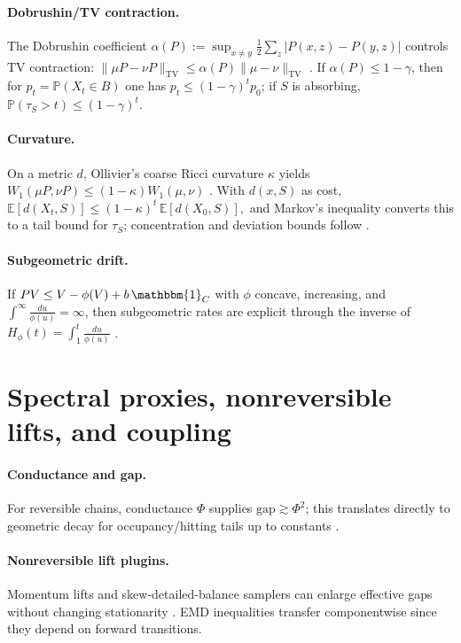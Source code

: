 \documentclass[11pt]{article}
\newcommand{\E}{\mathbb{E}}
\newcommand{\Prob}{\mathbb{P}}
\newcommand{\TV}{\mathrm{TV}}
\newcommand{\Wone}{W_1}
\newcommand{\1}{\mathbbm{1}}
\begin{document}
\paragraph{Dobrushin/TV contraction.}
The Dobrushin coefficient $\alpha(P):=\sup_{x\neq y}\tfrac12\sum_{z}|P(x,z)-P(y,z)|$ controls \(\TV\) contraction: $\|\mu P-\nu P\|_{\TV}\le \alpha(P)\|\mu-\nu\|_{\TV}$ \parencite[Ch.~4]{LevinPeresWilmer2009,Seneta2006}. If $\alpha(P)\le 1-\gamma$, then for $p_t=\Prob(X_t\in B)$ one has $p_t\le (1-\gamma)^t p_0$; if $S$ is absorbing, $\Prob(\tau_S>t)\le (1-\gamma)^t$.

\paragraph{Curvature.}
On a metric $d$, Ollivier’s coarse Ricci curvature $\kappa$ yields $\Wone(\mu P,\nu P)\le (1-\kappa)\Wone(\mu,\nu)$ \parencite{Ollivier2009}. With $d(x,S)$ as cost,
\(
\E[d(X_t,S)]\le (1-\kappa)^t\,\E[d(X_0,S)],
\)
and Markov’s inequality converts this to a tail bound for $\tau_S$; concentration and deviation bounds follow \parencite{JoulinOllivier2010}.

\paragraph{Subgeometric drift.}
If $PV\le V-\phi(V)+b\,\1_C$ with $\phi$ concave, increasing, and $\int^\infty \frac{du}{\phi(u)}=\infty$, then subgeometric rates are explicit through the inverse of $H_\phi(t)=\int_1^t \frac{du}{\phi(u)}$ \parencite{DoucFortMoulines2004,JarnerRoberts2002}.

\section{Spectral proxies, nonreversible lifts, and coupling}\label{sec:spectral}
\paragraph{Conductance and gap.}
For reversible chains, conductance $\Phi$ supplies $\mathrm{gap}\gtrsim \Phi^2$; this translates directly to geometric decay for occupancy/hitting tails up to constants \parencite{LawlerSokal1988,LevinPeresWilmer2009}.

\paragraph{Nonreversible lift plugins.}
Momentum lifts and skew-detailed-balance samplers can enlarge effective gaps without changing stationarity \parencite{ChenLovaszPak1999,DiaconisHolmesNeal2000}. EMD inequalities transfer componentwise since they depend on forward transitions.
\end{document}

